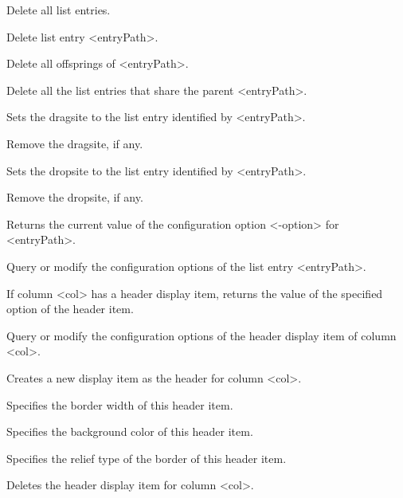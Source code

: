 \begin{enum}{1cm}
Delete all list entries.

Delete list entry <entryPath>.

Delete all offsprings of <entryPath>.

Delete all the list entries that share the parent <entryPath>.

Sets the dragsite to the list entry identified by <entryPath>.

Remove the dragsite, if any.

Sets the dropsite to the list entry identified by <entryPath>.

Remove the dropsite, if any.

Returns the current value of the configuration option <-option> for <entryPath>.

Query or modify the configuration options of the list entry <entryPath>.

If column <col> has a header display item, returns the value of the specified option of the header item. 

Query or modify the configuration options of the header display item of column <col>.

Creates a new display item as the header for column <col>.

Specifies the border width of this header item. 

Specifies the background color of this header item. 

Specifies the relief type of the border of this header item. 

Deletes the header display item for column <col>. 


\end{enum}
